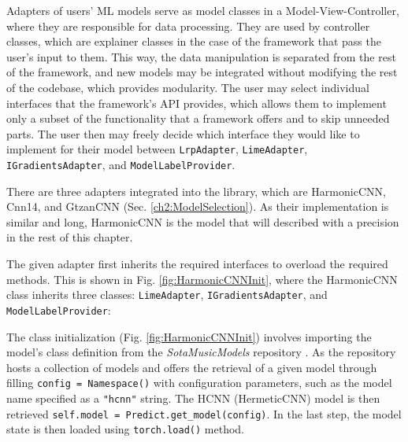 \documentclass[
    bindingoffset=5mm,  %
    footnoteindent=3mm, %
    hyphenation=true    %
]{src/wut-thesis}
\begin{document}
Adapters of users’ ML models serve as model classes in a Model-View-Controller,
where they are responsible for data processing. They are used by controller classes,
which are explainer classes in the case of the framework that pass the user’s input to them.
This way, the data manipulation is separated from the rest of the framework,
and new models may be integrated without modifying the rest of the codebase, which provides modularity.
The user may select individual interfaces that the framework’s API provides,
which allows them to implement only a subset of the functionality that a framework
offers and to skip unneeded parts. The user then may freely decide which interface
they would like to implement for their model between 
\texttt{LrpAdapter}, \texttt{LimeAdapter}, \texttt{IGradientsAdapter}, and \texttt{ModelLabelProvider}.

There are three adapters integrated into the library, which are HarmonicCNN, Cnn14, and GtzanCNN
(Sec. \ref{ch2:ModelSelection}). As their implementation is similar and long, HarmonicCNN is the model
that will described with a precision in the rest of this chapter.

The given adapter first inherits the required interfaces to overload the required methods.
This is shown in Fig. \ref{fig:HarmonicCNNInit}, where the HarmonicCNN class inherits three classes:
\texttt{LimeAdapter}, \texttt{IGradientsAdapter}, and \texttt{ModelLabelProvider}:

The class initialization (Fig. \ref{fig:HarmonicCNNInit}) involves importing the model’s class definition
from the \textit{SotaMusicModels} repository \cite{Won2020-ej}. As the repository hosts a collection
of models and offers the retrieval of a given model through filling \texttt{config = Namespace()} with
configuration parameters, such as the model name specified as a \texttt{"hcnn"} string.
The HCNN (HermeticCNN) model is then retrieved \texttt{self.model = Predict.get_model(config)}.
In the last step, the model state is then loaded using \texttt{torch.load()} method.
\end{document}
